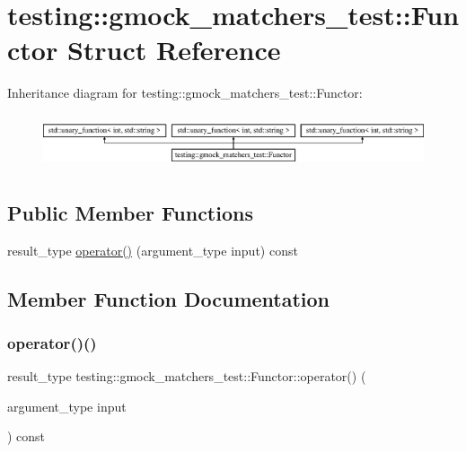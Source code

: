 \hypertarget{structtesting_1_1gmock__matchers__test_1_1_functor}{}\section{testing\+::gmock\+\_\+matchers\+\_\+test\+::Functor Struct Reference}
\label{structtesting_1_1gmock__matchers__test_1_1_functor}
Inheritance diagram for testing\+::gmock\+\_\+matchers\+\_\+test\+::Functor\+:\begin{figure}[H]
\begin{center}
\leavevmode
\includegraphics[height=1.609195cm]{d1/d5b/structtesting_1_1gmock__matchers__test_1_1_functor}
\end{center}
\end{figure}
\subsection*{Public Member Functions}
\begin{DoxyCompactItemize}
\item 
result\+\_\+type \mbox{\hyperlink{structtesting_1_1gmock__matchers__test_1_1_functor_a5beee965d62e6bc1d591163659bad913}{operator()}} (argument\+\_\+type input) const
\end{DoxyCompactItemize}


\subsection{Member Function Documentation}
\mbox{\label{structtesting_1_1gmock__matchers__test_1_1_functor_a5beee965d62e6bc1d591163659bad913}} 
\subsubsection{\texorpdfstring{operator()()}{operator()()}}
{\footnotesize\ttfamily result\+\_\+type testing\+::gmock\+\_\+matchers\+\_\+test\+::\+Functor\+::operator() (\begin{DoxyParamCaption}\item[{argument\+\_\+type}]{input }\end{DoxyParamCaption}) const\hspace{0.3cm}{\ttfamily [inline]}}




